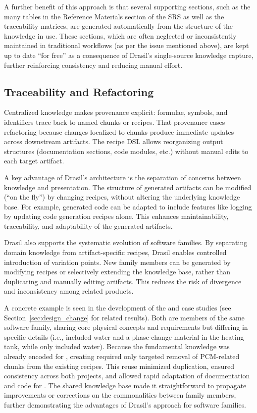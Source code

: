 A further benefit of this approach is that several supporting sections, such as 
the many tables in the Reference Materials section of the SRS as well as the 
traceability matrices, are generated automatically from the structure of the 
knowledge in use. These sections, which are often neglected or inconsistently 
maintained in traditional workflows (as per the issue mentioned above), are 
kept up to date ``for free'' as a consequence of Drasil's single-source
knowledge capture, further reinforcing consistency and reducing manual effort.

\subsection{Traceability and Refactoring}
\label{sec:dis_traceability}

Centralized knowledge makes provenance explicit: formulae, symbols, and
identifiers trace back to named chunks or recipes. That provenance eases
refactoring because changes localized to chunks produce immediate updates
across downstream artifacts. The recipe DSL allows reorganizing output
structures (documentation sections, code modules, etc.) without manual edits
to each target artifact.

A key advantage of Drasil's architecture is the separation of concerns between
knowledge and presentation. The structure of generated artifacts can be
modified (``on the fly'') by changing recipes, without altering the underlying
knowledge base. For example, generated code can be adapted to include features 
like logging by updating code generation recipes alone. This enhances 
maintainability, traceability, and adaptability of the generated artifacts.

Drasil also supports the systematic evolution of software families. By
separating domain knowledge from artifact-specific recipes, Drasil enables
controlled introduction of variation points. New family members can be
generated by modifying recipes or selectively extending the knowledge base,
rather than duplicating and manually editing artifacts. This reduces the risk
of divergence and inconsistency among related products.

A concrete example is seen in the development of the \sw{} and \np{} case
studies (see Section~\ref{sec:design_change} for related results). 
Both are members of the same software family, sharing core physical
concepts and requirements but differing in specific details (i.e., \sw{}
included water and a phase-change material in the heating tank, while \np{} 
only included water). Because the fundamental knowledge was already encoded for 
\sw{}, creating \np{} required only targeted removal of PCM-related chunks from 
the existing recipes. This reuse minimized duplication, ensured consistency 
across both projects, and allowed rapid adaptation of documentation and code 
for \np{}. The shared knowledge base made it straightforward to propagate 
improvements or corrections on the commonalities between family members, further 
demonstrating the advantages of Drasil's approach for software families.

